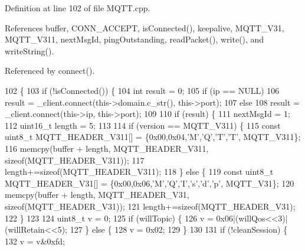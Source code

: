 Definition at line 102 of file M\+Q\+T\+T.\+cpp.



References buffer, C\+O\+N\+N\+\_\+\+A\+C\+C\+E\+PT, is\+Connected(), keepalive, M\+Q\+T\+T\+\_\+\+V31, M\+Q\+T\+T\+\_\+\+V311, next\+Msg\+Id, ping\+Outstanding, read\+Packet(), write(), and write\+String().



Referenced by connect().


\begin{DoxyCode}
102                                                                                                            
                                                                                                \{
103     \textcolor{keywordflow}{if} (!isConnected()) \{
104         \textcolor{keywordtype}{int} result = 0;
105         \textcolor{keywordflow}{if} (ip == NULL)
106             result = _client.connect(this->domain.c_str(), this->port);
107         \textcolor{keywordflow}{else}
108             result = _client.connect(this->ip, this->port);
109 
110         \textcolor{keywordflow}{if} (result) \{
111             nextMsgId = 1;
112             uint16\_t length = 5;
113 
114             \textcolor{keywordflow}{if} (version == MQTT_V311) \{
115                 \textcolor{keyword}{const} uint8\_t MQTT\_HEADER\_V311[] = \{0x00,0x04,\textcolor{charliteral}{'M'},\textcolor{charliteral}{'Q'},\textcolor{charliteral}{'T'},\textcolor{charliteral}{'T'},
      MQTT_V311\};
116                 memcpy(buffer + length, MQTT\_HEADER\_V311, \textcolor{keyword}{sizeof}(MQTT\_HEADER\_V311));
117                 length+=\textcolor{keyword}{sizeof}(MQTT\_HEADER\_V311);
118             \} \textcolor{keywordflow}{else} \{
119                 \textcolor{keyword}{const} uint8\_t MQTT\_HEADER\_V31[] = \{0x00,0x06,\textcolor{charliteral}{'M'},\textcolor{charliteral}{'Q'},\textcolor{charliteral}{'I'},\textcolor{charliteral}{'s'},\textcolor{charliteral}{'d'},\textcolor{charliteral}{'p'}, 
      MQTT_V31\};
120                 memcpy(buffer + length, MQTT\_HEADER\_V31, \textcolor{keyword}{sizeof}(MQTT\_HEADER\_V31));
121                 length+=\textcolor{keyword}{sizeof}(MQTT\_HEADER\_V31);
122             \}
123 
124             uint8\_t v = 0;
125             \textcolor{keywordflow}{if} (willTopic) \{
126                 v = 0x06|(willQos<<3)|(willRetain<<5);
127             \} \textcolor{keywordflow}{else} \{
128                 v = 0x02;
129             \}
130 
131             \textcolor{keywordflow}{if} (!cleanSession) \{
132               v = v&0xfd;

\end{DoxyCode}
